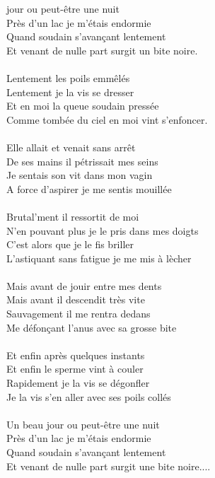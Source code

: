
 jour ou peut-être une nuit
\\Près d'un lac je m'étais endormie
\\Quand soudain s'avançant lentement
\\Et venant de nulle part surgit un bite noire.
\\\\Lentement les poils emmêlés
\\Lentement je la vis se dresser
\\Et en moi la queue soudain pressée
\\Comme tombée du ciel en moi vint s'enfoncer.
\\\\Elle allait et venait sans arrêt
\\De ses mains il pétrissait mes seins
\\Je sentais son vit dans mon vagin
\\A force d'aspirer je me sentis mouillée
\\\\Brutal'ment il ressortit de moi
\\N'en pouvant plus je le pris dans mes doigts
\\C'est alors que je le fis briller
\\L'astiquant sans fatigue je me mis à lècher
\\\\Mais avant de jouir entre mes dents
\\Mais avant il descendit très vite
\\Sauvagement il me rentra dedans
\\Me défonçant l'anus avec sa grosse bite
\\\\Et enfin après quelques instants
\\Et enfin le sperme vint à couler
\\Rapidement je la vis se dégonfler
\\Je la vis s'en aller avec ses poils collés
\\\\Un beau jour ou peut-être une nuit
\\Près d'un lac je m'étais endormie
\\Quand soudain s'avançant lentement
\\Et venant de nulle part surgit une bite noire....

\breakpage